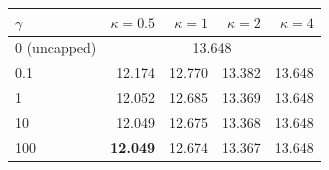 \begin{tabular}{lrrrr}
\toprule
$\gamma$ & $\kappa=0.5$ & $\kappa=1$ & $\kappa=2$ & $\kappa=4$ \\
\midrule
0 (uncapped) & \multicolumn{4}{c}{13.648} \\
0.1 & 12.174 & 12.770 & 13.382 & 13.648 \\
1 & 12.052 & 12.685 & 13.369 & 13.648 \\
10 & 12.049 & 12.675 & 13.368 & 13.648 \\
100 & \textbf{12.049} & 12.674 & 13.367 & 13.648 \\
\bottomrule
\end{tabular}
